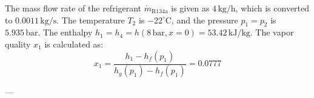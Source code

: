 The mass flow rate of the refrigerant \( \dot{m}_{\text{R134a}} \) is given as \( 4 \, \text{kg/h} \), which is converted to \( 0.0011 \, \text{kg/s} \).  
The temperature \( T_2 \) is \( -22^\circ\text{C} \), and the pressure \( p_1 = p_2 \) is \( 5.935 \, \text{bar} \).  
The enthalpy \( h_1 = h_4 = h(8 \, \text{bar}, x = 0) = 53.42 \, \text{kJ/kg} \).  
The vapor quality \( x_1 \) is calculated as:  
\[
x_1 = \frac{h_1 - h_f(p_1)}{h_g(p_1) - h_f(p_1)} = 0.0777
\]

---